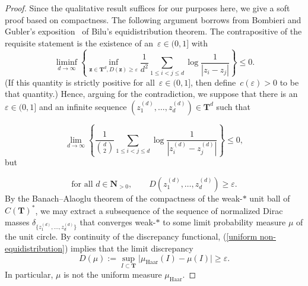 \documentclass[10pt]{amsart}
\def\NwithoutzeroA{\mathbf{N}_{> 0}}
\def\T{\mathbf{T}}
\theoremstyle{remark}
\numberwithin{equation}{subsection}
\def\numequation{\addtocounter{subsubsection}{1}\begin{equation}}
\begin{document}
\begin{proof} 
Since the qualitative result suffices for our purposes here, we give a soft proof based on compactness. The following argument borrows from
Bombieri and Gubler's exposition~\cite[page~103]{BombieriGubler} of Bilu's equidistribution theorem. The contrapositive of the requisite statement
is the existence of an~$\varepsilon \in (0,1]$ with
\[\liminf_{d\rightarrow \infty} \left\{ \inf_{\mathbf{z} \in \T^d, D(\mathbf{z}) \geq \varepsilon} \frac{1}{d^2} \sum_{1 \leq i < j \leq d} \log{\frac{1}{|z_i-z_j|}} \right\} \leq 0.\]
(If this quantity is strictly positive for all~$\varepsilon \in (0,1]$, then define~$c(\varepsilon) > 0$ to be that quantity.)
Hence, arguing for the contradiction, we suppose 
that there is an $\varepsilon \in (0,1]$ and an infinite sequence $(z_1^{(d)}, \ldots, z_d^{(d)}) \in \T^d$ such that
\numequation \label{non-positive energy}
\lim_{d \to \infty} \left\{ \frac{1}{\binom{d}{2}} \sum_{1 \leq i < j \leq d} \log{\frac{1}{|z_i^{(d)}-z_j^{(d)}|}} \right\} \leq 0,
\end{equation}
but
\numequation \label{uniform non-equidistribution}
\textrm{for all } d \in \NwithoutzeroA, \quad  \quad D(z_1^{(d)},\ldots, z_d^{(d)}) \geq \varepsilon.
\end{equation}
By the Banach--Alaoglu theorem of the compactness of the weak-$*$ unit ball of $C(\T)^*$, we may extract 
a subsequence of the sequence of normalized Dirac masses $\delta_{\{ z_1^{(d)},\ldots, z_d^{(d)} \}}$ that converges weak-$*$ 
to some limit probability measure $\mu$ of the unit circle. By   continuity of the discrepancy functional, (\ref{uniform non-equidistribution}) 
implies that the limit discrepancy
$$
D(\mu) := \sup_{I \subset \T} \big| \mu_{\mathrm{Haar}}(I) - \mu(I)  \big| \geq \varepsilon.
$$
In particular, $\mu$ is not the uniform measure $\mu_{\mathrm{Haar}}$. 


\end{proof}
\end{document}
